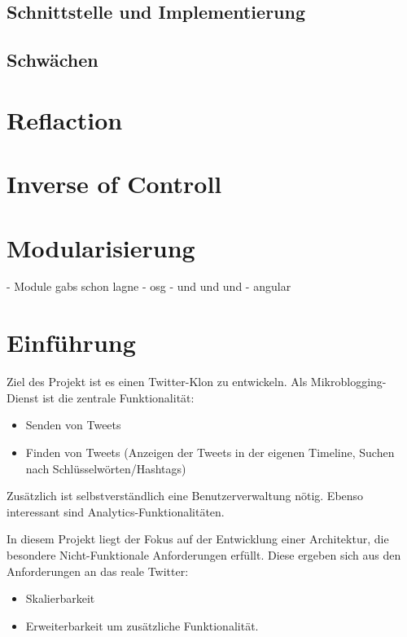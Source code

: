 \subsection{Schnittstelle und Implementierung} %
\label{sub:Schnittstelle und Implementierung}

\subsection{Schwächen} %
\label{sub:schwächen}

\section{Reflaction} 
\label{sec:reflaction}

\section{Inverse of Controll}
\label{sec:inverse_of_controll}

\section{Modularisierung}
\label{sec:modularisierung}
- Module gabs schon lagne 
- osg 
- und und und 
- angular 


\section{Einführung}
Ziel des Projekt ist es einen Twitter-Klon zu entwickeln. Als Mikroblogging-Dienst ist die zentrale Funktionalität:
\begin{itemize}
  \item Senden von Tweets
  \item Finden von Tweets (Anzeigen der Tweets in der eigenen Timeline, Suchen nach Schlüsselwörten/Hashtags)
\end{itemize}
Zusätzlich ist selbstverständlich eine Benutzerverwaltung nötig. Ebenso interessant sind Analytics-Funktionalitäten.

In diesem Projekt liegt der Fokus auf der Entwicklung  einer Architektur, die besondere Nicht-Funktionale Anforderungen
erfüllt. Diese ergeben sich aus den Anforderungen an das reale Twitter:
\begin{itemize}
  \item Skalierbarkeit
  \item Erweiterbarkeit um zusätzliche Funktionalität.
\end{itemize}

